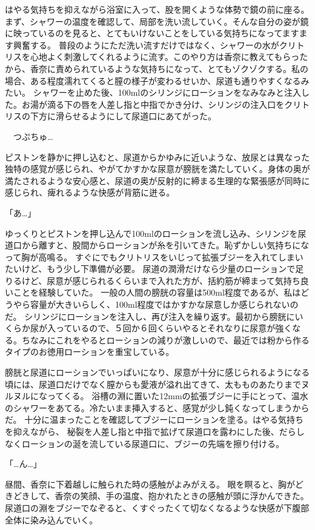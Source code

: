 はやる気持ちを抑えながら浴室に入って、股を開くような体勢で鏡の前に座る。まず、シャワーの温度を確認して、局部を洗い流していく。そんな自分の姿が鏡に映っているのを見ると、とてもいけないことをしている気持ちになってますます興奮する。
普段のようにただ洗い流すだけではなく、シャワーの水がクリトリスを心地よく刺激してくれるように流す。このやり方は香奈に教えてもらったから、香奈に責められているような気持ちになって、とてもゾクゾクする。私の場合、ある程度濡れてくると膣の様子が変わるせいか、尿道も通りやすくなるみたい。
シャワーを止めた後、100mlのシリンジにローションをなみなみと注入した。お湯が滴る下の唇を人差し指と中指でかき分け、シリンジの注入口をクリトリスの下方に滑らせるようにして尿道口にあてがった。

　つぷちゅ…

ピストンを静かに押し込むと、尿道からかゆみに近いような、放尿とは異なった独特の感覚が感じられ、やがてかすかな尿意が膀胱を満たしていく。身体の奥が満たされるような安心感と、尿道の奥が反射的に締まる生理的な緊張感が同時に感じられ、痺れるような快感が背筋に迸る。

「あ…」

ゆっくりとピストンを押し込んで100mlのローションを流し込み、シリンジを尿道口から離すと、股間からローションが糸を引いてきた。恥ずかしい気持ちになって胸が高鳴る。
すぐにでもクリトリスをいじって拡張ブジーを入れてしまいたいけど、もう少し下準備が必要。
尿道の潤滑だけなら少量のローションで足りるけど、尿意が感じられるくらいまで入れた方が、括約筋が締まって気持ち良いことを経験していた。
一般の人間の膀胱の容量は500ml程度であるが、私はどうやら容量が大きいらしく、100ml程度ではかすかな尿意しか感じられないのだ。
シリンジにローションを注入し、再び注入を繰り返す。最初から膀胱にいくらか尿が入っているので、５回か６回くらいやるとそれなりに尿意が強くなる。ちなみにこれをやるとローションの減りが激しいので、最近では粉から作るタイプのお徳用ローションを重宝している。

膀胱と尿道にローションでいっぱいになり、尿意が十分に感じられるようになる頃には、尿道口だけでなく膣からも愛液が溢れ出てきて、太もものあたりまでヌルヌルになってくる。
浴槽の淵に置いた12mmの拡張ブジーに手にとって、温水のシャワーをあてる。冷たいまま挿入すると、感覚が少し鈍くなってしまうからだ。
十分に温まったことを確認してブジーにローションを塗る。はやる気持ちを抑えながら、
秘裂を人差し指と中指で拡げて尿道口を露わにした後、だらしなくローションの涎を流している尿道口に、ブジーの先端を擦り付ける。

「…ん…」

昼間、香奈に下着越しに触られた時の感触がよみがえる。
眼を瞑ると、胸がどきどきして、香奈の笑顔、手の温度、抱かれたときの感触が頭に浮かんできた。
尿道口の淵をブジーでなぞると、くすぐったくて切なくなるような快感が下腹部全体に染み込んでいく。

